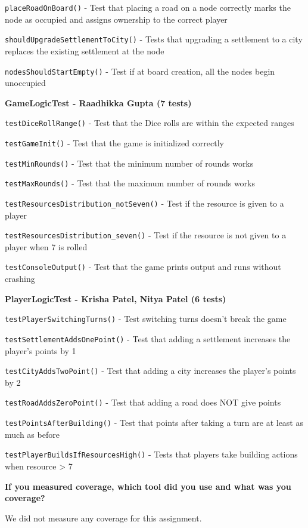 \texttt{placeRoadOnBoard()} - Test that placing a road on a node correctly marks the node as occupied and assigns ownership to the correct player 

\texttt{shouldUpgradeSettlementToCity()} - Tests that upgrading a settlement to a city replaces the existing settlement at the node

\texttt{nodesShouldStartEmpty()} - Test if at board creation, all the nodes begin unoccupied

\textbf{GameLogicTest - Raadhikka Gupta (7 tests)}

\texttt{testDiceRollRange()} - Test that the Dice rolls are within the expected ranges

\texttt{testGameInit()} - Test that the game is initialized correctly

\texttt{testMinRounds()} - Test that the minimum number of rounds works

\texttt{testMaxRounds()} - Test that the maximum number of rounds works

\texttt{testResourcesDistribution\_notSeven()} - Test if the resource is given to a player

\texttt{testResourcesDistribution\_seven()} - Test if the resource is not given to a player when 7 is rolled

\texttt{testConsoleOutput()} - Test that the game prints output and runs without crashing

\textbf{PlayerLogicTest - Krisha Patel, Nitya Patel (6 tests)}

\texttt{testPlayerSwitchingTurns()} - Test switching turns doesn’t break the game

\texttt{testSettlementAddsOnePoint()} - Test that adding a settlement increases the player's points by 1

\texttt{testCityAddsTwoPoint()} - Test that adding a city increases the player's points by 2

\texttt{testRoadAddsZeroPoint()} - Test that adding a road does NOT give points

\texttt{testPointsAfterBuilding()} - Test that points after taking a turn are at least as much as before

\texttt{testPlayerBuildsIfResourcesHigh()} - Tests that players take building actions when resource > 7

\textbf{If you measured coverage, which tool did you use and what was you coverage?}

We did not measure any coverage for this assignment.

